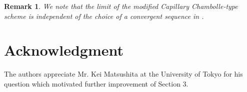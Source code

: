 \documentclass[11pt]{article}
\makeatletter
\numberwithin{equation}{section}
\newtheorem{remark}[theorem]{Remark}
\newcommand{\pOmega}[0]{\partial\Omega}
\newcommand{\fix}[1]{\textcolor{red}{#1}}
\newcounter{mathrecordid}
\newcommand{\mathboxbegin}[1]{%
  \stepcounter{mathrecordid}%
  \immediate\write\mathrecords{\themathrecordid,#1}%
  \special{pdf:bann << /Type /Annot /Subtype /Link /Border [0 0 0]
    /MathBoxID \themathrecordid /F 2
    /A << /S /URI /URI (urn:mathbox:\themathrecordid) >> >>}}
\newcommand{\mathboxinlineplain}[1]{$#1$}
\newcommand{\mathboxinline}[1]{%
  $\mathboxbegin{inline}%
  \special{pdf:literal direct /MathBoxBegin\themathrecordid\space MP}%
  #1\special{pdf:literal direct /MathBoxEnd\themathrecordid\space MP}%
  \special{pdf:eann}$}
\newcommand{\recordmath}{%
  \ifmeasuring@\expandafter\mathboxinlineplain
  \else\expandafter\mathboxinline\fi}
\makeatother
\begin{document}
\begin{remark}
We note that the limit of the modified Capillary Chambolle-type scheme is independent of the choice of a convergent sequence \recordmath{\beta^h \to \beta} in \recordmath{C^0(\pOmega)}.
\end{remark}


\section*{Acknowledgment} The authors appreciate Mr. Kei Matsushita at the University of Tokyo for his question which motivated further improvement of Section 3.



\end{document}

